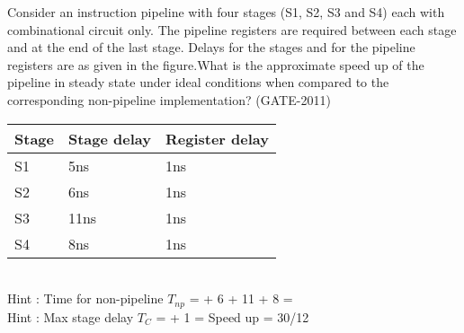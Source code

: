 \begin{questyle}
  \question  Consider an instruction pipeline with four stages (S1, S2, S3 and S4) each with
             combinational circuit only. The pipeline registers are required between each stage and
             at the end of the last stage. Delays for the stages and for the pipeline registers
             are as given in the figure.What is the approximate speed up of the pipeline in steady
             state under ideal conditions when compared to the corresponding non-pipeline implementation?  (GATE-2011)

          \begin{myTableStyle} \begin{tabular}{ |m{2cm}|m{2cm}|m{1.8cm}| } \hline
              Stage & Stage delay & Register delay  \\ \hline
              S1    & 5ns         & 1ns  \\ \hline
              S2    & 6ns         & 1ns  \\ \hline
              S3    & 11ns        & 1ns  \\ \hline
              S4    & 8ns         & 1ns  \\ \hline
          \end{tabular} \end{myTableStyle} \vspace{0.08in}

  \begin{oneparchoices}
  \end{oneparchoices} \\
  Hint : Time for non-pipeline \( T_{np} \) =  + 6 + 11 + 8 =  \\
  Hint : Max stage delay \(T_C\) =  + 1 =  \qquad Speed up = 30/12
\end{questyle}

